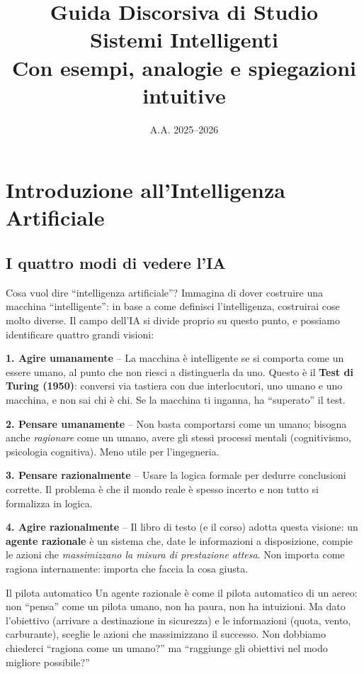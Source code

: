 \documentclass[12pt,a4paper]{article}
\title{\textbf{Guida Discorsiva di Studio}\\[6pt]
{\large Sistemi Intelligenti}\\[4pt]
\normalsize Con esempi{,} analogie e spiegazioni intuitive}
\author{}
\date{A.A. 2025--2026}
\begin{document}
\maketitle
\tableofcontents
\newpage

\section{Introduzione all'Intelligenza Artificiale}

\subsection{I quattro modi di vedere l'IA}

\begin{narrativo}{Cosa vuol dire ``intelligenza artificiale''?}
Immagina di dover costruire una macchina ``intelligente'': in base a come definisci l'intelligenza, costruirai cose molto diverse. Il campo dell'IA si divide proprio su questo punto, e possiamo identificare quattro grandi visioni:

\textbf{1. Agire umanamente} -- La macchina è intelligente se si comporta come un essere umano, al punto che non riesci a distinguerla da uno. Questo è il \textbf{Test di Turing (1950)}: conversi via tastiera con due interlocutori, uno umano e uno macchina, e non sai chi è chi. Se la macchina ti inganna, ha ``superato'' il test.

\textbf{2. Pensare umanamente} -- Non basta comportarsi come un umano; bisogna anche \emph{ragionare} come un umano, avere gli stessi processi mentali (cognitivismo, psicologia cognitiva). Meno utile per l'ingegneria.

\textbf{3. Pensare razionalmente} -- Usare la logica formale per dedurre conclusioni corrette. Il problema è che il mondo reale è spesso incerto e non tutto si formalizza in logica.

\textbf{4. Agire razionalmente} -- Il libro di testo (e il corso) adotta questa visione: un \textbf{agente razionale} è un sistema che, date le informazioni a disposizione, compie le azioni che \emph{massimizzano la misura di prestazione attesa}. Non importa come ragiona internamente: importa che faccia la cosa giusta.
\end{narrativo}

\begin{analogia}{Il pilota automatico}
Un agente razionale è come il pilota automatico di un aereo: non ``pensa'' come un pilota umano, non ha paura, non ha intuizioni. Ma dato l'obiettivo (arrivare a destinazione in sicurezza) e le informazioni (quota, vento, carburante), sceglie le azioni che massimizzano il successo. Non dobbiamo chiederci ``ragiona come un umano?'' ma ``raggiunge gli obiettivi nel modo migliore possibile?''
\end{analogia}
\end{document}
